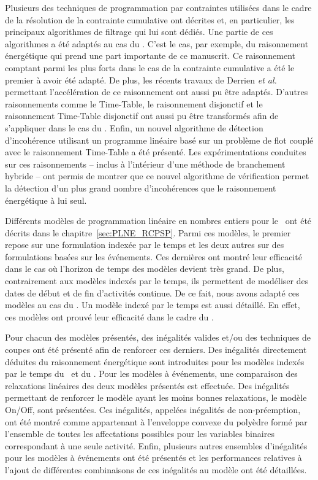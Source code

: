 Plusieurs des techniques de programmation par contraintes utilisées dans le
cadre de la résolution de la contrainte cumulative ont décrites et, en
particulier, les principaux algorithmes de filtrage qui lui sont
dédiés. Une partie de ces algorithmes a été adaptés au cas du
\CECSP. C'est le cas, par exemple, du raisonnement énergétique qui
prend une part importante de ce manuscrit. Ce raisonnement comptant
parmi les plus forts dans le cas de la contrainte cumulative a été le
premier à avoir été adapté. De plus, les récents travaux de Derrien
{\it et al.} permettant l'accélération de ce raisonnement ont aussi pu
être adaptés. D'autres raisonnements comme le Time-Table, le
raisonnement disjonctif et le raisonnement Time-Table disjonctif ont
aussi pu être transformés afin de s'appliquer dans le cas du
\CECSP. Enfin, un nouvel algorithme de détection d'incohérence
utilisant un programme linéaire basé sur un problème de flot couplé
avec le raisonnement Time-Table a été présenté. Les expérimentations
conduites sur ces raisonnements -- inclus à l'intérieur d'une méthode
de branchement hybride -- ont permis de montrer que ce nouvel
algorithme de vérification permet la détection d'un plus grand nombre
d'incohérences que le raisonnement énergétique à lui seul.

Différents modèles de programmation linéaire en nombres entiers pour le
\RCPSP~ont été décrits dans le chapitre~\ref{sec:PLNE_RCPSP}. Parmi
ces modèles, le premier repose sur une formulation indexée par le temps
et les deux autres sur des formulations basées sur les événements. Ces
dernières ont montré leur efficacité dans le cas où l'horizon de temps
des modèles devient très grand. De plus, contrairement aux modèles
indexés par le temps, ils permettent de modéliser des dates de début
et de fin d'activités continue. De ce fait, nous avons adapté ces
modèles au cas du \CECSP. Un modèle indexé par le temps est aussi
détaillé. En effet, ces modèles ont prouvé leur efficacité dans le
cadre du \RCPSP.

Pour chacun des modèles présentés, des inégalités valides et/ou des
techniques de coupes ont été présenté afin de renforcer ces
derniers. Des inégalités directement déduites du raisonnement
énergétique sont introduites pour les modèles indexés par le temps du
\CECSP~et du \RCPSP. Pour les modèles à événements, une comparaison
des relaxations linéaires des deux modèles présentés est
effectuée. Des inégalités permettant de renforcer le modèle ayant les
moins bonnes relaxations, le modèle On/Off, sont présentées. Ces
inégalités, appelées inégalités de non-préemption, ont été montré
comme appartenant à l'enveloppe convexe du polyèdre formé par
l’ensemble de toutes les affectations possibles pour les variables
binaires correspondant à une seule activité. Enfin, plusieurs autres
ensembles d'inégalités pour les modèles à événements ont été présentés
et les performances relatives à l'ajout de différentes combinaisons de
ces inégalités au modèle ont été détaillées. 

